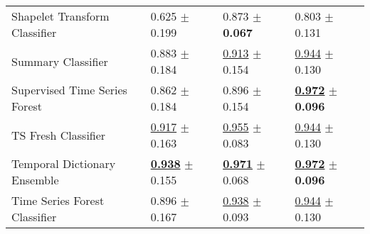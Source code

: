 \begin{tabular}{llll}
Shapelet Transform Classifier & \textcolor[rgb]{0.6903765690,0.3096234310,0}{0.625} $\pm$ \textcolor[rgb]{0.7390823473,0.2609176527,0}{0.199} & \textcolor[rgb]{0.5894011202,0.4105988798,0}{0.873} $\pm$ \textbf{\textcolor[rgb]{0.0000000000,0.5000000000,0}{0.067}} & \textcolor[rgb]{0.6767676768,0.3232323232,0}{0.803} $\pm$ \textcolor[rgb]{0.3197266102,0.5000000000,0}{0.131} \\
Summary Classifier & \textcolor[rgb]{0.1196652720,0.5000000000,0}{0.883} $\pm$ \textcolor[rgb]{0.6617144942,0.3382855058,0}{0.184} & \underline{\textcolor[rgb]{0.3483412322,0.5000000000,0}{0.913}} $\pm$ \textcolor[rgb]{0.9935655119,0.0064344881,0}{0.154} & \underline{\textcolor[rgb]{0.1111111111,0.5000000000,0}{0.944}} $\pm$ \textcolor[rgb]{0.3121982484,0.5000000000,0}{0.130} \\
Supervised Time Series Forest & \textcolor[rgb]{0.1656903766,0.5000000000,0}{0.862} $\pm$ \textcolor[rgb]{0.6604374232,0.3395625768,0}{0.184} & \textcolor[rgb]{0.4478672986,0.5000000000,0}{0.896} $\pm$ \textcolor[rgb]{1.0000000000,0.0000000000,0}{0.154} & \underline{\textbf{\textcolor[rgb]{0.0000000000,0.5000000000,0}{0.972}}} $\pm$ \textbf{\textcolor[rgb]{0.0000000000,0.5000000000,0}{0.096}} \\
TS Fresh Classifier & \underline{\textcolor[rgb]{0.0460251046,0.5000000000,0}{0.917}} $\pm$ \textcolor[rgb]{0.5577723962,0.4422276038,0}{0.163} & \underline{\textcolor[rgb]{0.0995260664,0.5000000000,0}{0.955}} $\pm$ \textcolor[rgb]{0.1853514393,0.5000000000,0}{0.083} & \underline{\textcolor[rgb]{0.1111111111,0.5000000000,0}{0.944}} $\pm$ \textcolor[rgb]{0.3121982484,0.5000000000,0}{0.130} \\
Temporal Dictionary Ensemble & \underline{\textbf{\textcolor[rgb]{0.0000000000,0.5000000000,0}{0.938}}} $\pm$ \textcolor[rgb]{0.5209154293,0.4790845707,0}{0.155} & \underline{\textbf{\textcolor[rgb]{0.0000000000,0.5000000000,0}{0.971}}} $\pm$ \textcolor[rgb]{0.0113491881,0.5000000000,0}{0.068} & \underline{\textbf{\textcolor[rgb]{0.0000000000,0.5000000000,0}{0.972}}} $\pm$ \textbf{\textcolor[rgb]{0.0000000000,0.5000000000,0}{0.096}} \\
Time Series Forest Classifier & \textcolor[rgb]{0.0920502092,0.5000000000,0}{0.896} $\pm$ \textcolor[rgb]{0.5790995120,0.4209004880,0}{0.167} & \underline{\textcolor[rgb]{0.1990521327,0.5000000000,0}{0.938}} $\pm$ \textcolor[rgb]{0.2953042690,0.5000000000,0}{0.093} & \underline{\textcolor[rgb]{0.1111111111,0.5000000000,0}{0.944}} $\pm$ \textcolor[rgb]{0.3121982484,0.5000000000,0}{0.130} \\

\end{tabular}
